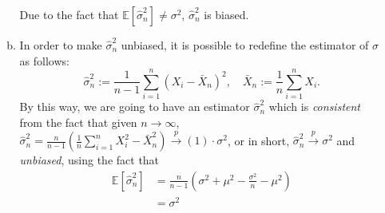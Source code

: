 \documentclass[a4paper,10pt]{article}
\begin{document}
\begin{enumerate}
\begin{enumerate}[(a)]
	Due to the fact that $\mathbb{E}\!\left[\hat{\sigma}_n^2\right] \neq \sigma^2$, $\hat{\sigma}_n^2$ is biased. \qedsymbol
	\item In order to make $\hat{\sigma}_n^2$ unbiased, it is possible to redefine the estimator of $\sigma$ as follows:
	\begin{equation*}
		\hat{\sigma}_n^2 := \frac{1}{n-1} \sum_{i=1}^{n} \left(X_i-\bar{X}_n\right)^2, \quad \bar{X}_n := \frac{1}{n} \sum_{i=1}^n X_i.
	\end{equation*}
	By this way, we are going to have an estimator $\hat{\sigma}_n^2$ which is \textit{consistent} from the fact that given $n \to \infty$, $\hat{\sigma}_n^2 = \frac{n}{n-1} \left(\frac{1}{n} \sum_{i=1}^{n} X_i^2 - \bar{X}_n^2\right) \overset{p}{\to} (1)\cdot\sigma^2$, or in short, $\hat{\sigma}_n^2 \overset{p}{\to} \sigma^2$ and \textit{unbiased}, using the fact that 
	\begin{equation*}
		\begin{aligned}
			\mathbb{E}\!\left[\hat{\sigma}_n^2\right] &= \frac{n}{n-1} \left(\sigma^2 + \mu^2 - \frac{\sigma^2}{n} - \mu^2\right) \\
			&= \sigma^2
		\end{aligned}
	\end{equation*}
\end{enumerate}


\end{enumerate}
\end{document}
